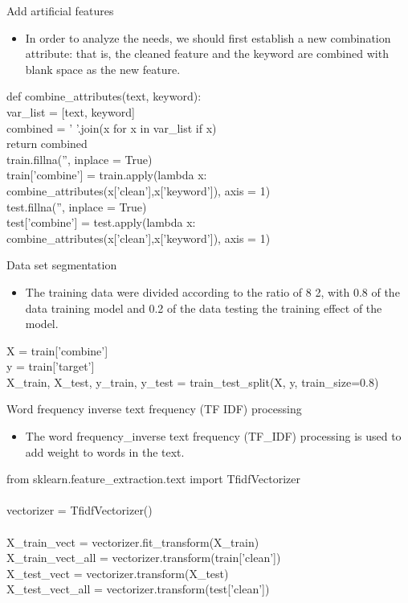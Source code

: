 \documentclass[
 size=14pt,
 paper=smartboard,  %
 mode=present, 		%
 display=slides, 	%
 style=tuliplab,  	%
 pauseslide,
 fleqn,leqno]{powerdot}
\begin{document}
\begin{slide}{Add artificial features}
			\begin{itemize}
			\item In order to analyze the needs, we should first establish a new combination attribute: that is, the cleaned feature and the keyword are combined with blank space as the new feature.\\
			\end{itemize}
		def combine\_attributes(text, keyword):\\
		var\_list = [text, keyword]\\
		combined = ' '.join(x for x in var\_list if x)\\
		return combined\\
		train.fillna('', inplace = True)\\
		train['combine'] = train.apply(lambda x:\\ combine\_attributes(x['clean'],x['keyword']), axis = 1)\\
		test.fillna('', inplace = True)\\
		test['combine'] = test.apply(lambda x:\\ combine\_attributes(x['clean'],x['keyword']), axis = 1)\\
\end{slide}
\begin{slide}{Data set segmentation}
		\begin{itemize}
			\item The training data were divided according to the ratio of 8 2, with 0.8 of the data training model and 0.2 of the data testing the training effect of the model.\\
		\end{itemize}
		X = train['combine']\\
		y = train['target']\\
		X\_train, X\_test, y\_train, y\_test = train\_test\_split(X, y, train\_size=0.8)\\
\end{slide}

\begin{slide}[toc=,bm=]{Word frequency inverse text frequency (TF IDF) processing}
	\begin{itemize}
	\item The word frequency\_inverse text frequency (TF\_IDF) processing is used to add weight to words in the text.
	\end{itemize}
	from sklearn.feature\_extraction.text import TfidfVectorizer\\
	\\
	vectorizer = TfidfVectorizer()\\
	\\
	X\_train\_vect = vectorizer.fit\_transform(X\_train)\\
	X\_train\_vect\_all = vectorizer.transform(train['clean'])\\
	X\_test\_vect = vectorizer.transform(X\_test)\\
	X\_test\_vect\_all = vectorizer.transform(test['clean'])\\

\end{slide}
\end{document}
